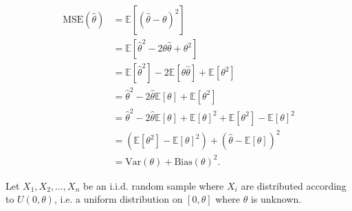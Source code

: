 \documentclass[answers]{exam}
\begin{document}
\begin{questions}
\begin{solution}
\begin{align*}
\text{MSE}(\hat{\theta}) &= \mathbb{E}[(\hat{\theta}-\theta)^2] \\ 
&= \mathbb{E}[\hat{\theta}^2 - 2\theta \hat{\theta} + \theta^2] \\ 
&= \mathbb{E}[\hat{\theta}^2] - 2\mathbb{E}[\theta \hat{\theta}] + \mathbb{E}[\theta^2] \\ 
&= \hat{\theta}^2 - 2\hat{\theta}\mathbb{E}[\theta] + \mathbb{E}[\theta^2] \\ 
&= \hat{\theta}^2 - 2\hat{\theta}\mathbb{E}[\theta] + \mathbb{E}[\theta]^2 + \mathbb{E}[\theta^2] - \mathbb{E}[\theta]^2 \\ 
&= (\mathbb{E}[\theta^2] - \mathbb{E}[\theta]^2) + (\hat{\theta} - \mathbb{E}[\theta])^2 \\ 
&= \text{Var}(\theta) + \text{Bias}(\theta)^2
.\end{align*}
\end{solution}

\question [25] Let $X_1,X_2,\ldots,X_{n}$ be an i.i.d. random sample where 
$X_{i}$ are distributed according to $U(0,\theta)$, i.e. a uniform distribution
on $[0,\theta]$ where $\theta$ is unknown.

\end{questions}
\end{document}
